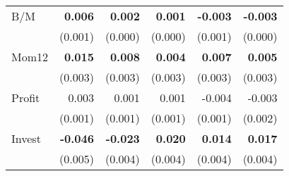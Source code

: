 \begin{singlespacing}
\begin{table}[H]
\begin{tabular}{lrrrrr}
B/M                  & \textbf{0.006}           & \textbf{0.002}                     & \textbf{0.001}                 & \textbf{-0.003}                     & \textbf{-0.003}                     \\
                     & (0.001)                   & (0.000)                              & (0.000)                          & (0.001)                              & (0.000)                              \\
Mom12                & \textbf{0.015}           & \textbf{0.008}                      & \textbf{0.004}                  & \textbf{0.007}                      & \textbf{0.005}                      \\
                     & (0.003)                   & (0.003)                              & (0.003)                         & (0.003)                             & (0.003)                              \\
Profit               & 0.003                    & 0.001                             & 0.001                          & -0.004                              & -0.003                           \\
                     & (0.001)                   & (0.001)                              & (0.001)                          & (0.001)                              & (0.002)                              \\
Invest               & \textbf{-0.046}          & \textbf{-0.023}                     & \textbf{0.020}                  & \textbf{0.014}                      & \textbf{0.017}                      \\
\multicolumn{1}{l}{} & (0.005)                   & (0.004)                              & (0.004)                          & (0.004)                              & (0.004)                              \\ \hline
\end{tabular}
\end{table}
 \end{singlespacing}
 
